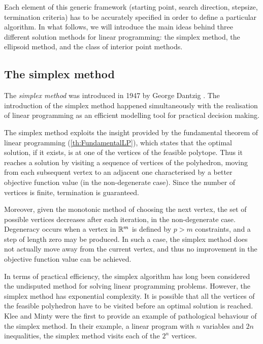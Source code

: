 Each element of this generic framework
(starting point, search direction, stepsize, termination criteria)
has to be accurately specified in order to define a particular algorithm.
In what follows, we will introduce the main ideas behind three 
different solution methods for linear programming: the simplex method,
the ellipsoid method, and the class of interior point methods.

%
%
\subsection{The simplex method}

The {\em simplex method} was introduced in 1947 by George Dantzig 
\cite{Dantzig63}. The
introduction of the simplex method happened simultaneously with
the realisation of linear programming as an efficient modelling tool
for practical decision making. 

The simplex method exploits the insight provided by the fundamental 
theorem of linear programming (\ref{th:FundamentalLP}), which states that
the optimal solution, if it exists, is at one of the vertices
of the feasible polytope.
Thus it reaches a solution by visiting a sequence of 
vertices of the polyhedron, moving from each subsequent vertex to an adjacent 
one characterised by a better objective function value
(in the non-degenerate case). 
Since the number of vertices is finite, termination is guaranteed.

Moreover, given the monotonic
method of choosing the next vertex, the set of possible vertices 
decreases after each iteration, in the non-degenerate case.
Degeneracy
occurs when a vertex in $\mathbb{R}^m$ is defined by $p > m$ constraints,
and a step of length zero may be produced.
In such a case, the simplex method does not actually move away
from the current vertex, and thus no improvement in the objective
function value can be achieved.


In terms of practical efficiency, the simplex algorithm has 
long been considered the undisputed method for solving linear programming
problems.
However, the simplex method has exponential complexity. It is possible that all
the vertices of the feasible polyhedron have to be visited
before an optimal solution is reached.
Klee and Minty \cite{KleeMinty} were the first to provide an example 
of pathological behaviour of the simplex method.
In their example, a linear program with $n$ variables 
and $2n$ inequalities,
the simplex method visits each of the $2^n$ vertices.


